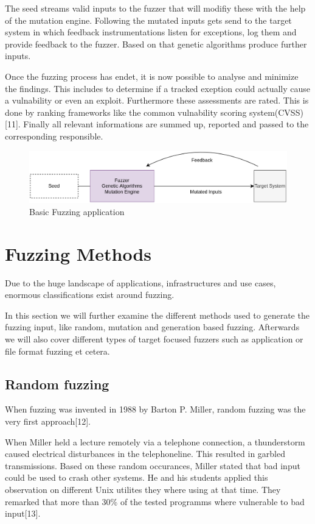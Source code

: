 \documentclass[journal=tosc,final]{iacrtrans}
\begin{document}
The seed streams valid inputs to the fuzzer that will modifiy these with the help of the mutation engine. Following the mutated inputs gets send to the target system in which feedback instrumentations listen for exceptions, log them and provide feedback to the fuzzer. Based on that genetic algorithms produce further inputs.

Once the fuzzing process has endet, it is now possible to analyse and minimize the findings. This includes to determine if a tracked exeption could actually cause a vulnability or even an exploit. Furthermore these assessments are rated. This is done by ranking frameworks like the common vulnability scoring system(CVSS)[11]. Finally all relevant informations are summed up, reported and passed to the corresponding responsible. 
\begin{figure}
\caption{Basic Fuzzing application}
 \begin{shaded}

\begin{center}
\includegraphics[scale=0.2]{../final2.png}
\end{center}
\end{shaded}

\end{figure}

\section{Fuzzing Methods}
Due to the huge landscape of applications, infrastructures and use cases, enormous classifications exist around fuzzing. 

In this section we will further examine the different methods used to generate the fuzzing input, like random, mutation and generation based fuzzing. Afterwards we will also cover different types of target focused fuzzers such as application or file format fuzzing et cetera. 
\subsection{Random fuzzing}
When fuzzing was invented in 1988 by Barton P. Miller, random fuzzing was the very first approach[12].

When Miller held a lecture remotely via a telephone connection, a thunderstorm caused electrical disturbances in the telephoneline. This resulted in garbled transmissions. Based on these random occurances, Miller stated that bad input  could be used to crash other systems. He and his students applied this observation on different Unix utilites they where using at that time. They remarked that  more than 30\% of the tested programms where vulnerable to bad input[13]. 
\end{document}
